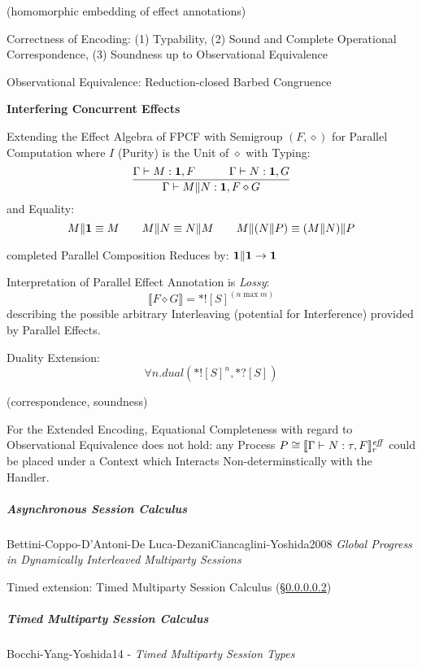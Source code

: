 (homomorphic embedding of effect annotations) %

Correctness of Encoding: (1) Typability, (2) Sound and Complete
Operational Correspondence, (3) Soundness up to Observational
Equivalence %

Observational Equivalence: Reduction-closed Barbed Congruence %


\asterism


\textbf{Interfering Concurrent Effects}

Extending the Effect Algebra of FPCF with Semigroup $(F,\diamond)$ for
Parallel Computation where $I$ (Purity) is the Unit of $\diamond$ with
Typing:
\[
  \frac{\Gamma \vdash M:\mathsf{\mathbf{1}},F \quad\quad\quad \Gamma \vdash N:\mathsf{\mathbf{1}},G}
  {\Gamma \vdash M\|N:\mathsf{\mathbf{1}},F \diamond G}
\]
and Equality:
\[
  M\|\mathbf{1} \equiv M \quad\quad M\|N \equiv N\|M
    \quad\quad M\|(N\|P) \equiv (M\|N)\|P
\]

completed Parallel Composition Reduces by: $\mathbf{1}\|\mathbf{1}
\rightarrow \mathbf{1}$

Interpretation of Parallel Effect Annotation is \emph{Lossy}:
\[
  \llbracket F \diamond G \rrbracket = *![S]^(n \;\text{max}\; m)
\]
describing the possible arbitrary Interleaving (potential for
Interference) provided by Parallel Effects. %

Duality Extension:
\[
  \forall n.dual(*![S]^n,*?[S])
\]

(correspondence, soundness) %

For the Extended Encoding, Equational Completeness with regard to
Observational Equivalence does not hold: any Process $P \cong
\llbracket \Gamma \vdash N:\tau,F \rrbracket_r^{\text{\emph{eff}}}$ could be placed
under a Context which Interacts Non-determinstically with the Handler.



\subparagraph{Asynchronous Session Calculus}
\label{sec:asynchronous_session_calculus}\hfill

Bettini-Coppo-D'Antoni-De Luca-DezaniCiancaglini-Yoshida2008
\emph{Global Progress in Dynamically Interleaved Multiparty Sessions}

Timed extension: Timed Multiparty Session Calculus
(\S\ref{sec:timed_multiparty_session_calculus})



\subparagraph{Timed Multiparty Session Calculus}
\label{sec:timed_multiparty_session_calculus}\hfill

Bocchi-Yang-Yoshida14 - \emph{Timed Multiparty Session Types}

